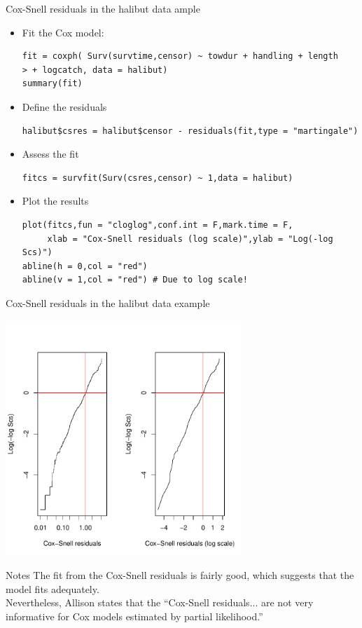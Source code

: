 \documentclass[envcountsect, 10pt, portrait, palatino]{beamer}
\begin{document}
\begin{frame}[fragile]{Cox-Snell residuals in the halibut data ample}
\begin{itemize}
\item Fit the Cox model:\\
\small
\begin{verbatim}
fit = coxph( Surv(survtime,censor) ~ towdur + handling + length
> + logcatch, data = halibut)
summary(fit)
\end{verbatim}
\normalsize
\item Define the residuals
\small
\begin{verbatim}
halibut$csres = halibut$censor - residuals(fit,type = "martingale")
\end{verbatim}
\normalsize
\item Assess the fit
\small
\begin{verbatim}
fitcs = survfit(Surv(csres,censor) ~ 1,data = halibut)
\end{verbatim}
\normalsize
\item Plot the results
\small
\begin{verbatim}
plot(fitcs,fun = "cloglog",conf.int = F,mark.time = F,
     xlab = "Cox-Snell residuals (log scale)",ylab = "Log(-log Scs)")
abline(h = 0,col = "red")
abline(v = 1,col = "red") # Due to log scale!
\end{verbatim}
\end{itemize}
\end{frame}
\begin{frame}{Cox-Snell residuals in the halibut data example}
\vspace*{-.5in}
\centerline{\includegraphics[width=3.5in]{coxsnell.pdf}}
\end{frame}
\begin{frame}{Notes}
The fit from the Cox-Snell residuals is fairly good, which suggests that the model fits adequately.\\[2ex]
Nevertheless, Allison states that the ``Cox-Snell residuals...  are not very informative
for Cox models estimated by partial likelihood.''
\end{frame}
\end{document}
